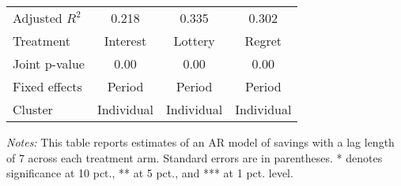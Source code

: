 \begin{table}[htbp]
{\begin{threeparttable}
\begin{tabular}{l*{3}{c}}
Adjusted \(R^{2}\)&    0.218         &    0.335         &    0.302         \\
Treatment       & Interest         &  Lottery         &   Regret         \\
Joint p-value   &     0.00         &     0.00         &     0.00         \\
Fixed effects   &   Period         &   Period         &   Period         \\
Cluster         &Individual         &Individual         &Individual         \\
\bottomrule \end{tabular} \begin{tablenotes}[flushleft] \footnotesize \item \emph{Notes:} This table reports estimates of an AR model of savings with a lag length of 7 across each treatment arm. Standard errors are in parentheses. * denotes significance at 10 pct., ** at 5 pct., and *** at 1 pct. level. \end{tablenotes} \end{threeparttable} } \end{table}
